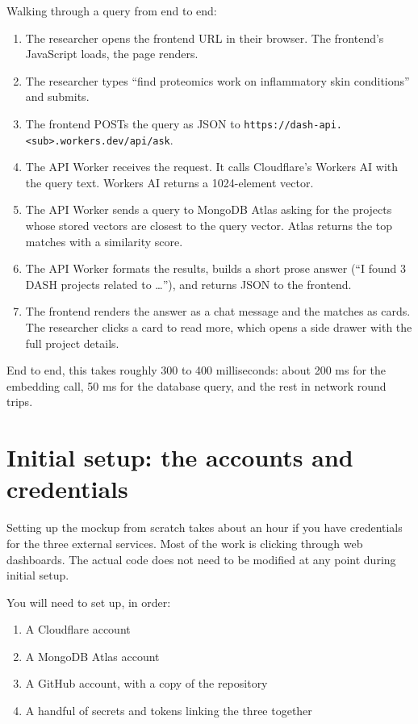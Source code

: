 \documentclass[11pt,a4paper]{article}
\begin{document}
Walking through a query from end to end:

\begin{enumerate}[leftmargin=1.5em,itemsep=2pt]
  \item The researcher opens the frontend URL in their browser. The frontend's JavaScript loads, the page renders.
  \item The researcher types ``find proteomics work on inflammatory skin conditions'' and submits.
  \item The frontend POSTs the query as JSON to \texttt{https://dash-api.<sub>.workers.dev/api/ask}.
  \item The API Worker receives the request. It calls Cloudflare's Workers AI with the query text. Workers AI returns a 1024-element vector.
  \item The API Worker sends a query to MongoDB Atlas asking for the projects whose stored vectors are closest to the query vector. Atlas returns the top matches with a similarity score.
  \item The API Worker formats the results, builds a short prose answer (``I found 3 DASH projects related to \ldots''), and returns JSON to the frontend.
  \item The frontend renders the answer as a chat message and the matches as cards. The researcher clicks a card to read more, which opens a side drawer with the full project details.
\end{enumerate}

End to end, this takes roughly 300 to 400 milliseconds: about 200 ms for the embedding call, 50 ms for the database query, and the rest in network round trips.

\section{Initial setup: the accounts and credentials}

Setting up the mockup from scratch takes about an hour if you have credentials for the three external services. Most of the work is clicking through web dashboards. The actual code does not need to be modified at any point during initial setup.

You will need to set up, in order:

\begin{enumerate}[leftmargin=1.5em,itemsep=2pt]
  \item A Cloudflare account
  \item A MongoDB Atlas account
  \item A GitHub account, with a copy of the repository
  \item A handful of secrets and tokens linking the three together
\end{enumerate}
\end{document}
